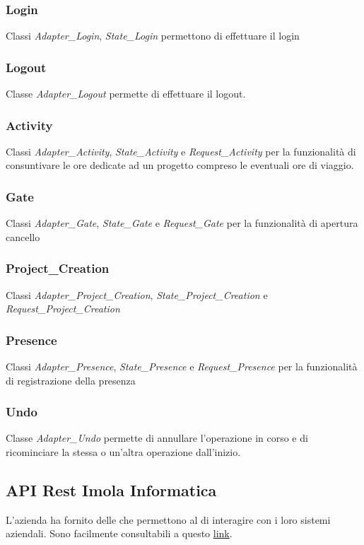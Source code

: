 \subsubsection{Login} Classi \textit{Adapter\_Login}, \textit{State\_Login} permettono di effettuare il login
\subsubsection{Logout} Classe \textit{Adapter\_Logout} permette di effettuare il logout.
\subsubsection{Activity} Classi \textit{Adapter\_Activity}, \textit{State\_Activity} e \textit{Request\_Activity} per la funzionalità di consuntivare le ore dedicate ad un progetto compreso le eventuali ore di viaggio.
\subsubsection{Gate} Classi \textit{Adapter\_Gate}, \textit{State\_Gate} e \textit{Request\_Gate} per la funzionalità di apertura cancello
\subsubsection{Project\_Creation} Classi \textit{Adapter\_Project\_Creation}, \textit{State\_Project\_Creation} e \textit{Request\_Project\_Creation}
\subsubsection{Presence} Classi \textit{Adapter\_Presence}, \textit{State\_Presence} e \textit{Request\_Presence} per la funzionalità di registrazione della presenza
\subsubsection{Undo} Classe \textit{Adapter\_Undo} permette di annullare l'operazione in corso e di ricominciare la stessa o un'altra operazione dall'inizio.
\subsection{API Rest Imola Informatica} L'azienda ha fornito delle  che permettono al  di interagire con i loro sistemi aziendali. Sono facilmente consultabili a questo \href{https://apibot4me.imolinfo.it/}{\color{blue} link}.
\newpage

